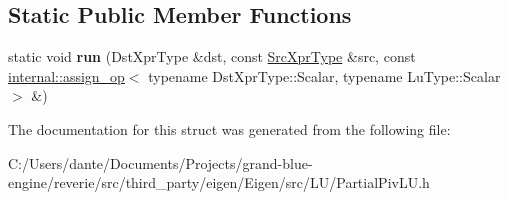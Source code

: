 \subsection*{Static Public Member Functions}
\begin{DoxyCompactItemize}
\item 
\mbox{\label{struct_eigen_1_1internal_1_1_assignment_3_01_dst_xpr_type_00_01_inverse_3_01_partial_piv_l_u_3_0fe0876a690a87045a6eaca571908231d_acd231757f32088e6544b2f6bb0eb9e6b}} 
static void {\bfseries run} (Dst\+Xpr\+Type \&dst, const \mbox{\hyperlink{class_eigen_1_1_inverse}{Src\+Xpr\+Type}} \&src, const \mbox{\hyperlink{struct_eigen_1_1internal_1_1assign__op}{internal\+::assign\+\_\+op}}$<$ typename Dst\+Xpr\+Type\+::\+Scalar, typename Lu\+Type\+::\+Scalar $>$ \&)
\end{DoxyCompactItemize}


The documentation for this struct was generated from the following file\+:\begin{DoxyCompactItemize}
\item 
C\+:/\+Users/dante/\+Documents/\+Projects/grand-\/blue-\/engine/reverie/src/third\+\_\+party/eigen/\+Eigen/src/\+L\+U/Partial\+Piv\+L\+U.\+h\end{DoxyCompactItemize}
